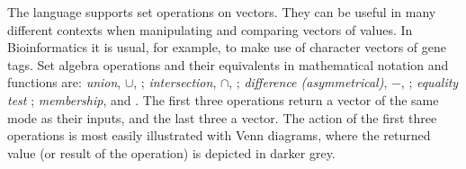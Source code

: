\documentclass[krantz2]{krantz}\usepackage{knitr}
\begin{document}
The \Rlang language supports set operations on vectors. They can be useful in many different contexts when manipulating and comparing vectors of values. In Bioinformatics it is usual, for example, to make use of character vectors of gene tags. Set algebra operations and their equivalents in mathematical notation and \Rlang functions are: \emph{union}, $\cup$, ; \emph{intersection}, $\cap$, ; \emph{difference (asymmetrical)}, $-$, ; \emph{equality test} ; \emph{membership},  and . The first three operations return a vector of the same mode as their inputs, and the last three a  vector. The action of the first three operations is most easily illustrated with Venn diagrams, where the returned value (or result of the operation) is depicted in darker grey.\vspace{1ex}
\end{document}
